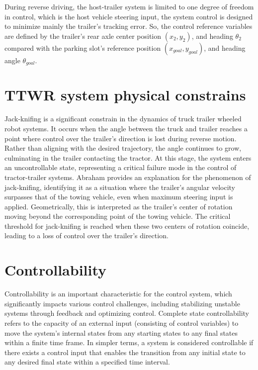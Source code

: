 During reverse driving, the host-trailer system is limited to one degree of freedom in control, which is the host vehicle steering input, the system control is designed to minimize mainly the trailer's tracking error. So, the control reference variables are defined by the trailer’s rear axle center position $(x_2, y_2)$, and heading ${\theta}_2$ compared with the parking slot's reference position  $(x_{goal}, y_{goal})$, and heading angle ${\theta}_{goal}$.

\section{TTWR system physical constrains}

Jack-knifing is a significant constrain in the dynamics of truck trailer wheeled robot systems. It occurs when the angle between the truck and trailer reaches a point where control over the trailer's direction is lost during reverse motion. Rather than aligning with the desired trajectory, the angle continues to grow, culminating in the trailer contacting the tractor. At this stage, the system enters an uncontrollable state, representing a critical failure mode in the control of tractor-trailer systems. Abraham \parencite{abraham2013trailer} provides an explanation for the phenomenon of jack-knifing, identifying it as a situation where the trailer's angular velocity surpasses that of the towing vehicle, even when maximum steering input is applied. Geometrically, this is interpreted as the trailer's center of rotation moving beyond the corresponding point of the towing vehicle. The critical threshold for jack-knifing is reached when these two centers of rotation coincide, leading to a loss of control over the trailer's direction.

\section{Controllability}

Controllability is an important characteristic for the control system, which significantly impacts various control challenges, including stabilizing unstable systems through feedback and optimizing control. Complete state controllability refers to the capacity of an external input (consisting of control variables) to move the system's internal states from any starting states to any final states within a finite time frame. In simpler terms, a system is considered controllable if there exists a control input that enables the transition from any initial state to any desired final state within a specified time interval.


